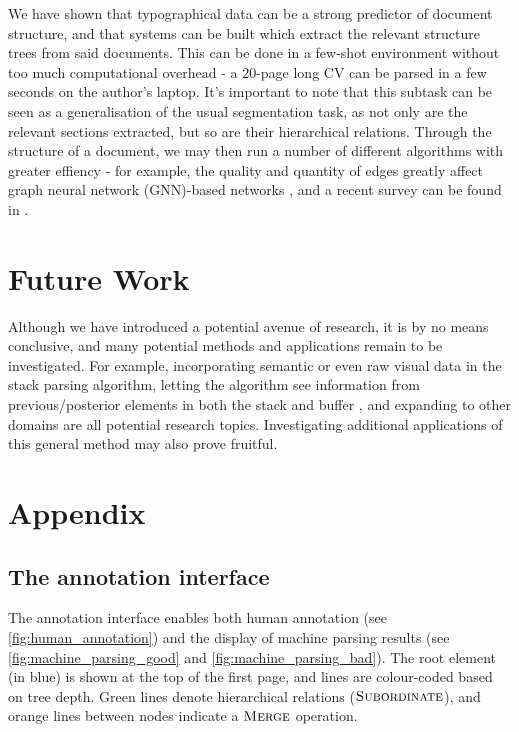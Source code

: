 \documentclass[11pt]{article}
\begin{document}
We have shown that typographical data can be a strong predictor of document structure, and that systems can be built which extract the relevant structure trees from said documents. This can be done in a few-shot environment without too much computational overhead - a 20-page long CV can be parsed in a few seconds on the author's laptop. It's important to note that this subtask can be seen as a generalisation of the usual segmentation task, as not only are the relevant sections extracted, but so are their hierarchical relations. Through the structure of a document, we may then run a number of different algorithms with greater effiency - for example, the quality and quantity of edges greatly affect graph neural network (GNN)-based networks \citep{scarselli2008graph, gemelli2023doc2graph}, and a recent survey can be found in \citet{wu2023graph}.

\section{Future Work}

Although we have introduced a potential avenue of research, it is by no means conclusive, and many potential methods and applications remain to be investigated. For example, incorporating semantic or even raw visual data in the stack parsing algorithm, letting the algorithm see information from previous/posterior elements in both the stack and buffer \citep{dyer2015transition}, and expanding to other domains are all potential research topics. Investigating additional applications of this general method may also prove fruitful. 




\appendix

\section{Appendix}
\label{sec:appendix}

\subsection{The annotation interface}
The annotation interface enables both human annotation (see \ref{fig:human_annotation}) and the display of machine parsing results (see \ref{fig:machine_parsing_good} and \ref{fig:machine_parsing_bad}). The root element (in blue) is shown at the top of the first page, and lines are colour-coded based on tree depth. Green lines denote hierarchical relations ($\textsc{Subordinate}$), and orange lines between nodes indicate a $\textsc{Merge}$ operation.
\end{document}

